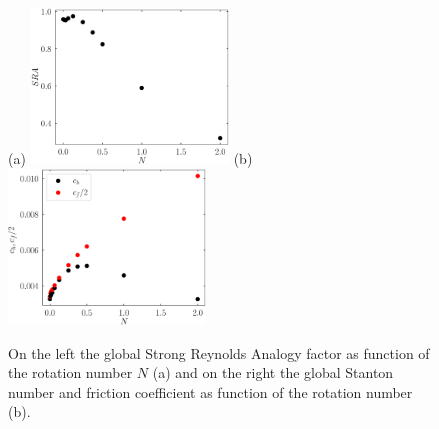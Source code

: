 \documentclass[lineno]{jfm}
\begin{document}
	\begin{figure}
                \centering
                (a) \includegraphics[width=5.25cm]{Figures//sra_global_500.eps}
                (b) \includegraphics[width=5.25cm]{Figures//ch_cf_500.eps} \\
                \caption{
			On the left the global Strong Reynolds Analogy factor as function of the rotation number $N$ (a) 
			and on the right the global Stanton number and friction coefficient as function of the rotation number (b).
                        }
                        \label{fig:Ch_Cf}
        \end{figure}
\end{document}

